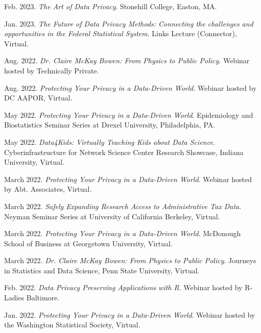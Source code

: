 \begin{etaremune}[topsep=0pt, itemsep=4pt, partopsep=0pt, parsep=0pt]
    \item Feb. 2023. \textit{The Art of Data Privacy}. Stonehill College, Easton, MA.
    
    \item Jan. 2023. \textit{The Future of Data Privacy Methods: Connecting the challenges and opportunities in the Federal Statistical System}. Links Lecture (Connector), Virtual.
    
    \item Aug. 2022. \textit{Dr. Claire McKay Bowen: From Physics to Public Policy}. Webinar hosted by Technically Private.
    
    \item Aug. 2022. \textit{Protecting Your Privacy in a Data-Driven World}. Webinar hosted by DC AAPOR, Virtual.
    
    \item May 2022. \textit{Protecting Your Privacy in a Data-Driven World}. Epidemiology and Biostatistics Seminar Series at Drexel University, Philadelphia, PA.
    
    \item May 2022. \textit{Data4Kids: Virtually Teaching Kids about Data Science}. Cyberinfrastructure for Network Science Center Research Showcase, Indiana University, Virtual.
    
    \item March 2022. \textit{Protecting Your Privacy in a Data-Driven World}. Webinar hosted by Abt. Associates, Virtual.
    
    \item March 2022. \textit{Safely Expanding Research Access to Administrative Tax Data}. Neyman Seminar Series at University of California Berkeley, Virtual.
    
    \item March 2022. \textit{Protecting Your Privacy in a Data-Driven World}. McDonough School of Business at Georgetown University, Virtual.
    
    \item March 2022. \textit{Dr. Claire McKay Bowen: From Physics to Public Policy}. Journeys in Statistics and Data Science, Penn State University, Virtual.
        
    \item Feb. 2022. \textit{Data Privacy Preserving Applications with R}. Webinar hosted by R-Ladies Baltimore.

    \item Jan. 2022. \textit{Protecting Your Privacy in a Data-Driven World}. Webinar hosted by the Washington Statistical Society, Virtual.
    

\end{etaremune}
